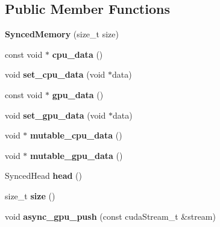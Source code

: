 \subsection*{Public Member Functions}
\begin{DoxyCompactItemize}
\item 
{\bfseries Synced\+Memory} (size\+\_\+t size)\hypertarget{classcaffe_1_1SyncedMemory_a858ddd33252ddfd6e8bb2dc59ab7691b}{}\label{classcaffe_1_1SyncedMemory_a858ddd33252ddfd6e8bb2dc59ab7691b}

\item 
const void $\ast$ {\bfseries cpu\+\_\+data} ()\hypertarget{classcaffe_1_1SyncedMemory_a5ffa0255e243f223e1af064fb7322ae4}{}\label{classcaffe_1_1SyncedMemory_a5ffa0255e243f223e1af064fb7322ae4}

\item 
void {\bfseries set\+\_\+cpu\+\_\+data} (void $\ast$data)\hypertarget{classcaffe_1_1SyncedMemory_a4118cdf888d8663c4f88c037ce3e3b8e}{}\label{classcaffe_1_1SyncedMemory_a4118cdf888d8663c4f88c037ce3e3b8e}

\item 
const void $\ast$ {\bfseries gpu\+\_\+data} ()\hypertarget{classcaffe_1_1SyncedMemory_acf04d9fabcde73902bdad08672696933}{}\label{classcaffe_1_1SyncedMemory_acf04d9fabcde73902bdad08672696933}

\item 
void {\bfseries set\+\_\+gpu\+\_\+data} (void $\ast$data)\hypertarget{classcaffe_1_1SyncedMemory_a9d3831fe6c03370890d76dc8a82f4ca1}{}\label{classcaffe_1_1SyncedMemory_a9d3831fe6c03370890d76dc8a82f4ca1}

\item 
void $\ast$ {\bfseries mutable\+\_\+cpu\+\_\+data} ()\hypertarget{classcaffe_1_1SyncedMemory_ab32cd46d7f0cf524d79e4ba7da7449dd}{}\label{classcaffe_1_1SyncedMemory_ab32cd46d7f0cf524d79e4ba7da7449dd}

\item 
void $\ast$ {\bfseries mutable\+\_\+gpu\+\_\+data} ()\hypertarget{classcaffe_1_1SyncedMemory_ab6ca4faa7233c8ac2319acb72ba0441e}{}\label{classcaffe_1_1SyncedMemory_ab6ca4faa7233c8ac2319acb72ba0441e}

\item 
Synced\+Head {\bfseries head} ()\hypertarget{classcaffe_1_1SyncedMemory_abd3e8f08d0186d3460fcce1378a2dc4c}{}\label{classcaffe_1_1SyncedMemory_abd3e8f08d0186d3460fcce1378a2dc4c}

\item 
size\+\_\+t {\bfseries size} ()\hypertarget{classcaffe_1_1SyncedMemory_ae181c18b137d62de33bc91501aabb841}{}\label{classcaffe_1_1SyncedMemory_ae181c18b137d62de33bc91501aabb841}

\item 
void {\bfseries async\+\_\+gpu\+\_\+push} (const cuda\+Stream\+\_\+t \&stream)\hypertarget{classcaffe_1_1SyncedMemory_a16308ac4986b99fb62303c4f4c1d118b}{}\label{classcaffe_1_1SyncedMemory_a16308ac4986b99fb62303c4f4c1d118b}

\end{DoxyCompactItemize}


